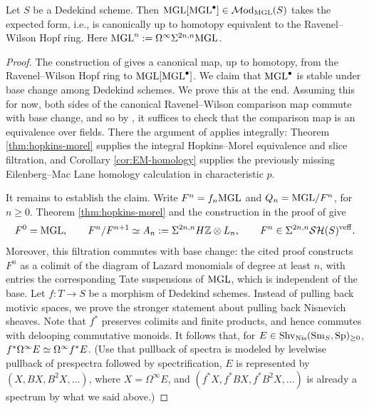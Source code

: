 \documentclass{amsart}
\numberwithin{proposition}{section}
\numberwithin{equation}{section}
\begin{document}
\begin{theorem}
Let $S$ be a Dedekind scheme.
Then $\mathrm{MGL}[\mathrm{MGL}^\bullet] \in \mathcal{M}\mathrm{od}_{\mathrm{MGL}}(S)$ takes the expected form, i.e., is canonically up to homotopy equivalent to the Ravenel--Wilson Hopf ring.
Here $\mathrm{MGL}^n := \Omega^\infty \Sigma^{2n,n}\mathrm{MGL}$.
\end{theorem}
\begin{proof}
The construction of \cite[\S5.1]{bachmann-wilson} gives a canonical map, up to homotopy, from the Ravenel--Wilson Hopf ring to $\mathrm{MGL}[\mathrm{MGL}^\bullet]$.
We claim that $\mathrm{MGL}^\bullet$ is stable under base change among Dedekind schemes.
We prove this at the end.
Assuming this for now, both sides of the canonical Ravenel--Wilson comparison map commute with base change, and so by \cite[Proposition~B.3]{bachmann-norms}, it suffices to check that the comparison map is an equivalence over fields.
There the argument of \cite[\S5]{bachmann-wilson} applies integrally: Theorem \ref{thm:hopkins-morel} supplies the integral Hopkins--Morel equivalence and slice filtration, and Corollary \ref{cor:EM-homology} supplies the previously missing Eilenberg--Mac Lane homology calculation in characteristic $p$.

It remains to establish the claim.
Write $F^n = f_n\mathrm{MGL}$ and $Q_n = \mathrm{MGL}/F^n$, for $n \ge 0$.
Theorem \ref{thm:hopkins-morel} and the construction in the proof of \cite[Theorem~4.6]{spitzweck2010relations} give
\[
F^0 = \mathrm{MGL},
\qquad
F^n/F^{n+1} \simeq A_n := \Sigma^{2n,n}H\mathbb{Z} \otimes L_n,
\qquad
F^n \in \Sigma^{2n,n}\mathcal{SH}(S)^{\mathrm{veff}}.
\]
Moreover, this filtration commutes with base change: the cited proof constructs $F^n$ as a colimit of the diagram of Lazard monomials of degree at least $n$, with entries the corresponding Tate suspensions of $\mathrm{MGL}$, which is independent of the base.
Let $f:T \to S$ be a morphism of Dedekind schemes.
Instead of pulling back motivic spaces, we prove the stronger statement about pulling back Nisnevich sheaves.
Note that $f^*$ preserves colimits and finite products, and hence commutes with delooping commutative monoids.
It follows that, for $E \in \mathrm{S}\mathrm{hv}_{\mathrm{Nis}}({\mathrm{S}\mathrm{m}}_S,\mathrm{Sp})_{\ge 0}$, $f^*\Omega^\infty E \simeq \Omega^\infty f^*E$.
(Use that pullback of spectra is modeled by levelwise pullback of prespectra followed by spectrification, $E$ is represented by $(X,BX,B^2X,\dots)$, where $X=\Omega^\infty E$, and $(f^*X, f^*BX, f^* B^2 X, \dots)$ is already a spectrum by what we said above.)


\end{proof}
\end{document}
